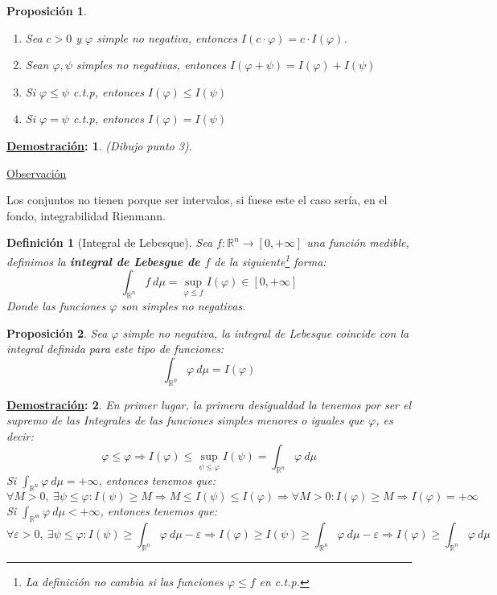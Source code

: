 \documentclass[10pt,a4paper,openright]{book}
\theoremstyle{break}
\newtheorem*{defi}{Definición}
\newtheorem*{prop}{Proposición}
\newtheorem*{demo}{\underline{Demostración}:}
\begin{document}
\begin{prop}
\begin{enumerate}
    \item Sea $c > 0$ y $\varphi$ simple no negativa, entonces $I\left(c\cdot \varphi\right) = c\cdot I\left(\varphi\right)$.
    \item Sean $\varphi, \psi$ simples no negativas, entonces $I\left(\varphi + \psi\right) = I\left(\varphi\right) + I\left(\psi\right)$
    \item Si $\varphi \le \psi$ c.t.p, entonces $I\left(\varphi\right) \le I\left(\psi\right)$
    \item Si $\varphi = \psi$ c.t.p, entonces $I\left(\varphi\right) = I\left(\psi\right)$
\end{enumerate}
\end{prop}
\begin{demo}
(\textit{Dibujo punto 3}). 
\end{demo}

\underline{Observación}

Los conjuntos no tienen porque ser intervalos, si fuese este el caso sería, en el fondo, integrabilidad Rienmann.

\begin{defi}[Integral de Lebesque]
Sea $f: \mathbb{R}^n \rightarrow \left[0, +\infty\right]$ una función medible, definimos la \textbf{integral de Lebesgue de $f$} de la siguiente\footnote{La definición no cambia si las funciones $\varphi \leq f$ en c.t.p.} forma:
$$\int_{\mathbb{R}^n}f \ d\mu = \sup_{\varphi \leq f} I\left(\varphi\right) \in \left[0, +\infty\right]$$
Donde las funciones $\varphi$ son simples no negativas.
\end{defi}

\begin{prop}
Sea $\varphi$ simple no negativa, la integral de Lebesque coincide con la integral definida para este tipo de funciones:
$$\int_{\mathbb{R}^n}\varphi \ d \mu = I\left(\varphi\right)$$
\end{prop}
\begin{demo}
En primer lugar, la primera desigualdad la tenemos por ser el supremo de las Integrales de las funciones simples menores o iguales que $\varphi$, es decir:
$$\varphi \le \varphi \Rightarrow I\left(\varphi\right) \leq \sup_{\psi \leq \varphi} I(\psi) = \int_{\mathbb{R}^n} \varphi \ d \mu $$
Si $\int_{\mathbb{R}^n} \varphi \ d \mu = +\infty$, entonces tenemos que:
$$\forall M > 0,\ \exists \psi \le \varphi: I\left(\psi\right) \ge M \Rightarrow M \le I\left(\psi\right) \le I\left(\varphi\right) \Rightarrow \forall M > 0: I\left(\varphi\right) \ge M \Rightarrow I\left(\varphi\right) = +\infty$$
Si $\int_{\mathbb{R}^m}\varphi \ d \mu < +\infty$, entonces tenemos que:
$$\forall \varepsilon > 0,\ \exists \psi \le \varphi: I\left(\psi\right) \ge \int_{\mathbb{R}^n}\varphi \ d \mu - \varepsilon \Rightarrow I\left(\varphi\right) \ge I(\psi) \geq  \int_{\mathbb{R}^n}\varphi \ d \mu - \varepsilon \Rightarrow I\left(\varphi\right) \ge \int_{\mathbb{R}^n}\varphi \ d \mu$$
\end{demo}
\end{document}
